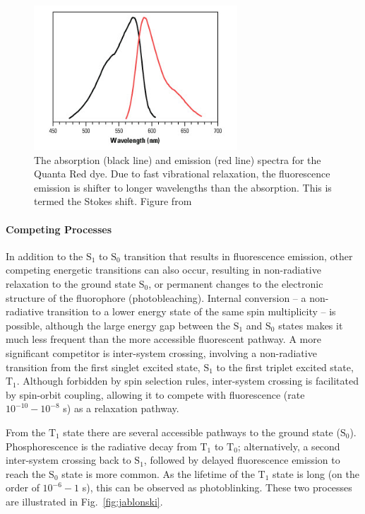 \begin{figure}
	\begin{center}
	\includegraphics*[clip=true, width=3in]{introduction/QuantaRed-Spectra.jpg}
	\caption{The absorption (black line) and emission (red line) spectra for the Quanta Red dye. Due to fast vibrational relaxation, the fluorescence emission is shifter to longer wavelengths than the absorption. This is termed the Stokes shift. Figure from~\cite{spectral}}
	\label{fig:stokes}
	\end{center}
\end{figure}

\paragraph{Competing Processes}
In addition to the $\text{S}_1$ to $\text{S}_0$ transition that results in fluorescence emission, other competing energetic transitions can also occur, resulting in non-radiative relaxation to the ground state $\text{S}_0$, or permanent changes to the electronic structure of the fluorophore (photobleaching). Internal conversion -- a non-radiative transition to a lower energy state of the same spin multiplicity -- is possible, although the large energy gap between the $\text{S}_1$ and $\text{S}_0$ states makes it much less frequent than the more accessible fluorescent pathway. A more significant competitor is inter-system crossing, involving a non-radiative transition from the first singlet excited state, $\text{S}_1$ to the first triplet excited state, $\text{T}_1$. Although forbidden by spin selection rules, inter-system crossing is facilitated by spin-orbit coupling, allowing it to compete with fluorescence (rate $10^{-10} - 10^{-8}$ s) as a relaxation pathway.

From the $\text{T}_1$ state there are several accessible pathways to the ground state ($\text{S}_0$). Phosphorescence is the radiative decay from $\text{T}_1$ to $\text{T}_0$; alternatively, a second inter-system crossing back to $\text{S}_1$, followed by delayed fluorescence emission to reach the $\text{S}_0$ state is more common. As the lifetime of the $\text{T}_1$ state is long (on the order of $10^{-6} - 1$ s), this can be observed as photoblinking. These two processes are illustrated in Fig.~\ref{fig:jablonski}.  

